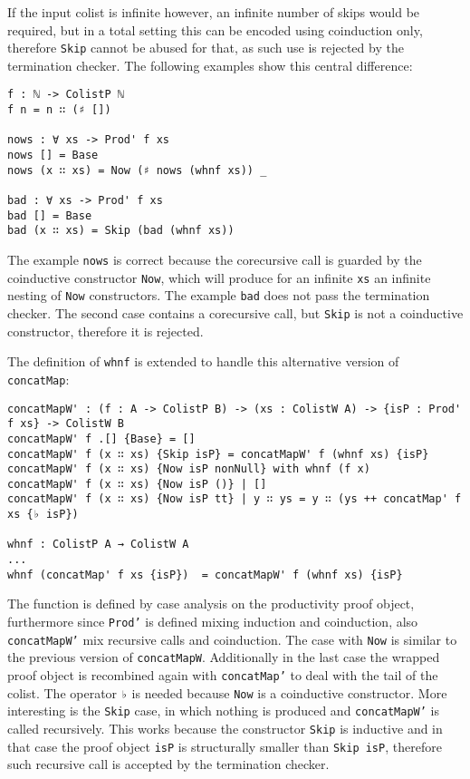 \documentclass[10pt,a4paper]{article}
\begin{document}
If the input colist is infinite however, an infinite number of skips would be required, but in a total setting this can be encoded using coinduction only, therefore \texttt{Skip} cannot be abused for that, as such use is rejected by the termination checker.
The following examples show this central difference:
\begin{verbatim}
f : ℕ -> ColistP ℕ
f n = n ∷ (♯ [])

nows : ∀ xs -> Prod' f xs
nows [] = Base
nows (x ∷ xs) = Now (♯ nows (whnf xs)) _

bad : ∀ xs -> Prod' f xs
bad [] = Base
bad (x ∷ xs) = Skip (bad (whnf xs))
\end{verbatim}
The example \texttt{nows} is correct because the corecursive call is guarded by the coinductive constructor \texttt{Now}, which will produce for an infinite \texttt{xs} an infinite nesting of \texttt{Now} constructors.
The example \texttt{bad} does not pass the termination checker.
The second case contains a corecursive call, but \texttt{Skip} is not a coinductive constructor, therefore it is rejected.

The definition of \texttt{whnf} is extended to handle this alternative version of \texttt{concatMap}:
\begin{verbatim}
concatMapW' : (f : A -> ColistP B) -> (xs : ColistW A) -> {isP : Prod' f xs} -> ColistW B
concatMapW' f .[] {Base} = []
concatMapW' f (x ∷ xs) {Skip isP} = concatMapW' f (whnf xs) {isP}
concatMapW' f (x ∷ xs) {Now isP nonNull} with whnf (f x)
concatMapW' f (x ∷ xs) {Now isP ()} | []
concatMapW' f (x ∷ xs) {Now isP tt} | y ∷ ys = y ∷ (ys ++ concatMap' f xs {♭ isP})

whnf : ColistP A → ColistW A
...
whnf (concatMap' f xs {isP})  = concatMapW' f (whnf xs) {isP}
\end{verbatim}
The function is defined by case analysis on the productivity proof object, furthermore since \texttt{Prod'} is defined mixing induction and coinduction, also \texttt{concatMapW'} mix recursive calls and coinduction. 
The case with \texttt{Now} is similar to the previous version of \texttt{concatMapW}. Additionally in the last case the wrapped proof object is recombined again with \texttt{concatMap'} to deal with the tail of the colist. The operator \texttt{♭} is needed because \texttt{Now} is a coinductive constructor. More interesting is the \texttt{Skip} case, in which nothing is produced and \texttt{concatMapW'} is called recursively.
This works because the constructor \texttt{Skip} is inductive and in that case the proof object \texttt{isP} is structurally smaller than \texttt{Skip isP}, therefore such recursive call is accepted by the termination checker.
\end{document}
